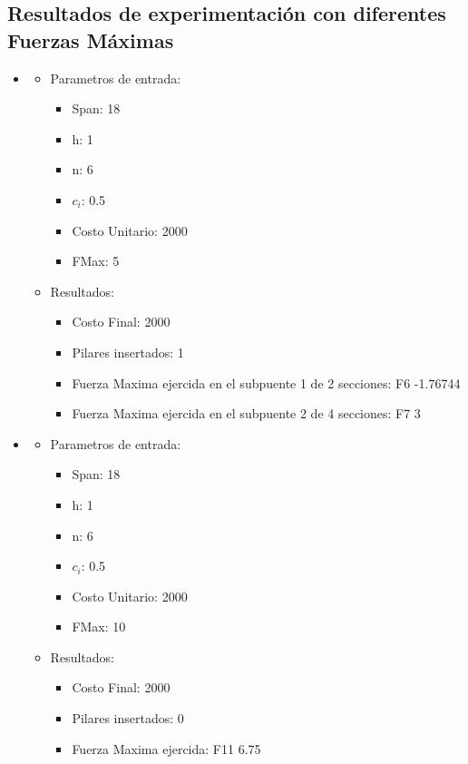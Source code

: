 \subsection{Resultados de experimentaci\'on con diferentes Fuerzas M\'aximas}
\begin{itemize}
\item
  \begin{itemize}
    \item Parametros de entrada:
	  \begin{itemize}
	    \item Span: 18
	    \item h: 1
	    \item n: 6
	    \item $c_i$: 0.5
	    \item Costo Unitario: 2000
	    \item FMax: 5
	  \end{itemize}
      \item Resultados:
	  \begin{itemize}
	    \item Costo Final: 2000
	    \item Pilares insertados: 1
	    \item Fuerza Maxima ejercida en el subpuente 1 de 2 secciones: F6 -1.76744
	    \item Fuerza Maxima ejercida en el subpuente 2 de 4 secciones: F7 3
	  \end{itemize}
      \end{itemize}
\item
  \begin{itemize}
    \item Parametros de entrada:
	  \begin{itemize}
	    \item Span: 18
	    \item h: 1
	    \item n: 6
	    \item $c_i$: 0.5
	    \item Costo Unitario: 2000
	    \item FMax: 10
	  \end{itemize}
      \item Resultados:
	  \begin{itemize}
	    \item Costo Final: 2000
	    \item Pilares insertados: 0
	    \item Fuerza Maxima ejercida: F11 6.75
	  \end{itemize}

\end{itemize}
\end{itemize}
